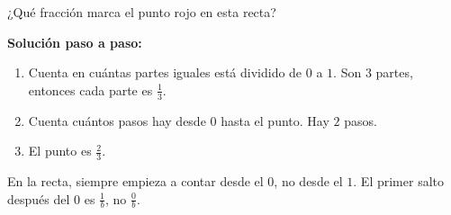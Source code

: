 \begin{wbexample}
¿Qué fracción marca el punto rojo en esta recta?

\begin{center}
\end{center}

\textbf{Solución paso a paso:}
\begin{enumerate}
\item Cuenta en cuántas partes iguales está dividido de $0$ a $1$. Son $3$ partes, entonces cada parte es $\frac{1}{3}$.
\item Cuenta cuántos pasos hay desde $0$ hasta el punto. Hay $2$ pasos.
\item El punto es $\frac{2}{3}$.
\end{enumerate}
\end{wbexample}

\begin{wbtip}
En la recta, siempre empieza a contar desde el $0$, no desde el $1$. El primer salto después del $0$ es $\frac{1}{b}$, no $\frac{0}{b}$.
\begin{center}
\end{center}
\end{wbtip}

